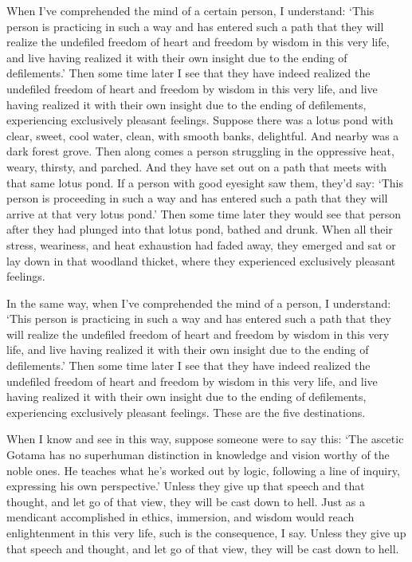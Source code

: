 \documentclass[12pt,openany]{book}%
\begin{document}
When I’ve comprehended the mind of a certain person, I understand: ‘This person is practicing in such a way and has entered such a path that they will realize the undefiled freedom of heart and freedom by wisdom in this very life, and live having realized it with their own insight due to the ending of defilements.’ Then some time later I see that they have indeed realized the undefiled freedom of heart and freedom by wisdom in this very life, and live having realized it with their own insight due to the ending of defilements, experiencing exclusively pleasant feelings. Suppose there was a lotus pond with clear, sweet, cool water, clean, with smooth banks, delightful. And nearby was a dark forest grove. Then along comes a person struggling in the oppressive heat, weary, thirsty, and parched. And they have set out on a path that meets with that same lotus pond. If a person with good eyesight saw them, they’d say: ‘This person is proceeding in such a way and has entered such a path that they will arrive at that very lotus pond.’ Then some time later they would see that person after they had plunged into that lotus pond, bathed and drunk. When all their stress, weariness, and heat exhaustion had faded away, they emerged and sat or lay down in that woodland thicket, where they experienced exclusively pleasant feelings. 

In the same way, when I’ve comprehended the mind of a person, I understand: ‘This person is practicing in such a way and has entered such a path that they will realize the undefiled freedom of heart and freedom by wisdom in this very life, and live having realized it with their own insight due to the ending of defilements.’ Then some time later I see that they have indeed realized the undefiled freedom of heart and freedom by wisdom in this very life, and live having realized it with their own insight due to the ending of defilements, experiencing exclusively pleasant feelings. These are the five destinations. 

When I know and see in this way, suppose someone were to say this: ‘The ascetic Gotama has no superhuman distinction in knowledge and vision worthy of the noble ones. He teaches what he’s worked out by logic, following a line of inquiry, expressing his own perspective.’ Unless they give up that speech and that thought, and let go of that view, they will be cast down to hell. Just as a mendicant accomplished in ethics, immersion, and wisdom would reach enlightenment in this very life, such is the consequence, I say. Unless they give up that speech and thought, and let go of that view, they will be cast down to hell. 
\end{document}
